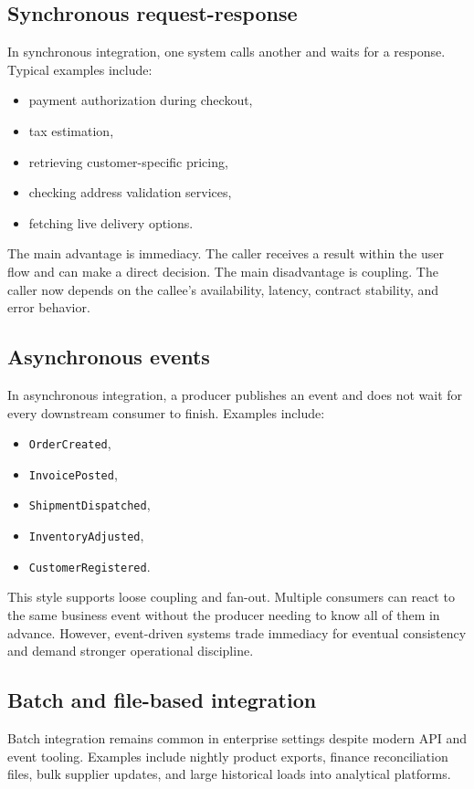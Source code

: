 \subsection{Synchronous request-response}
In synchronous integration, one system calls another and waits for a response.
Typical examples include:
\begin{itemize}
  \item payment authorization during checkout,
  \item tax estimation,
  \item retrieving customer-specific pricing,
  \item checking address validation services,
  \item fetching live delivery options.
\end{itemize}

The main advantage is immediacy.
The caller receives a result within the user flow and can make a direct decision.
The main disadvantage is coupling.
The caller now depends on the callee's availability, latency, contract stability, and error behavior.

\subsection{Asynchronous events}
In asynchronous integration, a producer publishes an event and does not wait for every downstream consumer to finish.
Examples include:
\begin{itemize}
  \item \texttt{OrderCreated},
  \item \texttt{InvoicePosted},
  \item \texttt{ShipmentDispatched},
  \item \texttt{InventoryAdjusted},
  \item \texttt{CustomerRegistered}.
\end{itemize}

This style supports loose coupling and fan-out.
Multiple consumers can react to the same business event without the producer needing to know all of them in advance.
However, event-driven systems trade immediacy for eventual consistency and demand stronger operational discipline.

\subsection{Batch and file-based integration}
Batch integration remains common in enterprise settings despite modern API and event tooling.
Examples include nightly product exports, finance reconciliation files, bulk supplier updates, and large historical loads into analytical platforms.


